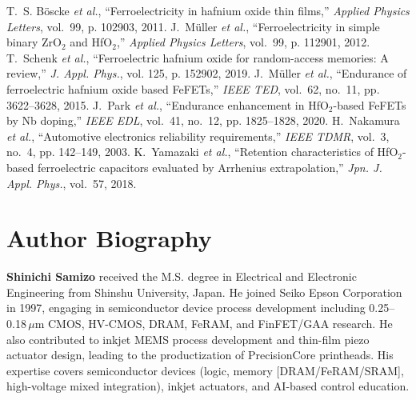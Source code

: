 \documentclass[journal]{IEEEtran}
\begin{document}
\begin{thebibliography}{9}
T.~S. Böscke \emph{et al.}, ``Ferroelectricity in hafnium oxide thin films,'' \emph{Applied Physics Letters}, vol.~99, p. 102903, 2011.
J.~Müller \emph{et al.}, ``Ferroelectricity in simple binary ZrO$_2$ and HfO$_2$,'' \emph{Applied Physics Letters}, vol.~99, p. 112901, 2012.
T.~Schenk \emph{et al.}, ``Ferroelectric hafnium oxide for random-access memories: A review,'' \emph{J. Appl. Phys.}, vol. 125, p. 152902, 2019.
J.~Müller \emph{et al.}, ``Endurance of ferroelectric hafnium oxide based FeFETs,'' \emph{IEEE TED}, vol.~62, no.~11, pp. 3622–3628, 2015.
J.~Park \emph{et al.}, ``Endurance enhancement in HfO$_2$-based FeFETs by Nb doping,'' \emph{IEEE EDL}, vol.~41, no.~12, pp. 1825–1828, 2020.
H.~Nakamura \emph{et al.}, ``Automotive electronics reliability requirements,'' \emph{IEEE TDMR}, vol.~3, no.~4, pp. 142–149, 2003.
K.~Yamazaki \emph{et al.}, ``Retention characteristics of HfO$_2$-based ferroelectric capacitors evaluated by Arrhenius extrapolation,'' \emph{Jpn. J. Appl. Phys.}, vol.~57, 2018.
\end{thebibliography}

\section*{Author Biography}
\textbf{Shinichi Samizo} received the M.S. degree in Electrical and Electronic Engineering from Shinshu University, Japan. He joined Seiko Epson Corporation in 1997, engaging in semiconductor device process development including 0.25–0.18\,$\mu$m CMOS, HV-CMOS, DRAM, FeRAM, and FinFET/GAA research. He also contributed to inkjet MEMS process development and thin-film piezo actuator design, leading to the productization of PrecisionCore printheads. His expertise covers semiconductor devices (logic, memory [DRAM/FeRAM/SRAM], high-voltage mixed integration), inkjet actuators, and AI-based control education.
\end{document}
